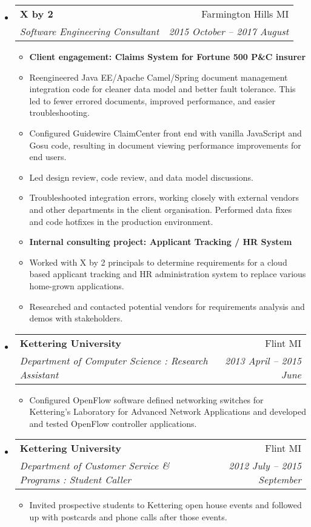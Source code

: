 \documentclass[letterpaper,10pt]{article}
\makeatletter
\newcommand{\resitem}[1]{\item #1 \vspace{-2pt}}
\newcommand{\ressubheading}[4]{
\begin{tabular*}{6.5in}{l@{\cftdotfill{\cftsecdotsep}\extracolsep{\fill}}r}
        \textbf{#1} & #2 \\
        \textit{#3} & \textit{#4} \\
\end{tabular*}\vspace{-6pt}}
\makeatother
\begin{document}
\begin{itemize}

\item
\ressubheading{X by 2}{Farmington Hills MI}{Software Engineering Consultant}{2015 October -- 2017 August}
\begin{itemize}\small
    \resitem{{\bf Client engagement: Claims System for Fortune 500 P\&C insurer}}
    \resitem{Reengineered Java EE/Apache Camel/Spring document management integration code for cleaner data model 
    	     and better fault tolerance. This led to fewer errored documents, improved performance, and easier troubleshooting.}
    \resitem{Configured Guidewire ClaimCenter front end with vanilla JavaScript and Gosu code, resulting in document viewing 
    	     performance improvements for end users.}
    \resitem{Led design review, code review, and data model discussions.}
    \resitem{Troubleshooted integration errors, working closely with external vendors and other departments in the client 
    	     organisation. Performed data fixes and code hotfixes in the production environment.}
    \resitem{{\bf Internal consulting project: Applicant Tracking / HR System}}
    \resitem{Worked with X by 2 principals to determine requirements for a cloud based applicant tracking
             and HR administration system to replace various home-grown applications.}
    \resitem{Researched and contacted potential vendors for requirements analysis and demos with stakeholders.}
\end{itemize}

\item
\ressubheading{Kettering University}{Flint MI}{Department of Computer Science : Research Assistant}{2013 April -- 2015 June}
\begin{itemize}\small
    \resitem{Configured OpenFlow software defined networking switches for Kettering's 
    	     Laboratory for Advanced Network Applications and developed and tested OpenFlow controller applications.}
\end{itemize}

\iffalse
\item
\ressubheading{Kettering University}{Flint MI}{Department of Customer Service \& Programs : Student Caller}{2012 July -- 2015 September}
\begin{itemize}\small
    \resitem{Invited prospective students to Kettering open house events and followed up with postcards 
             and phone calls after those events.}
\end{itemize}


\end{itemize}
\end{document}
